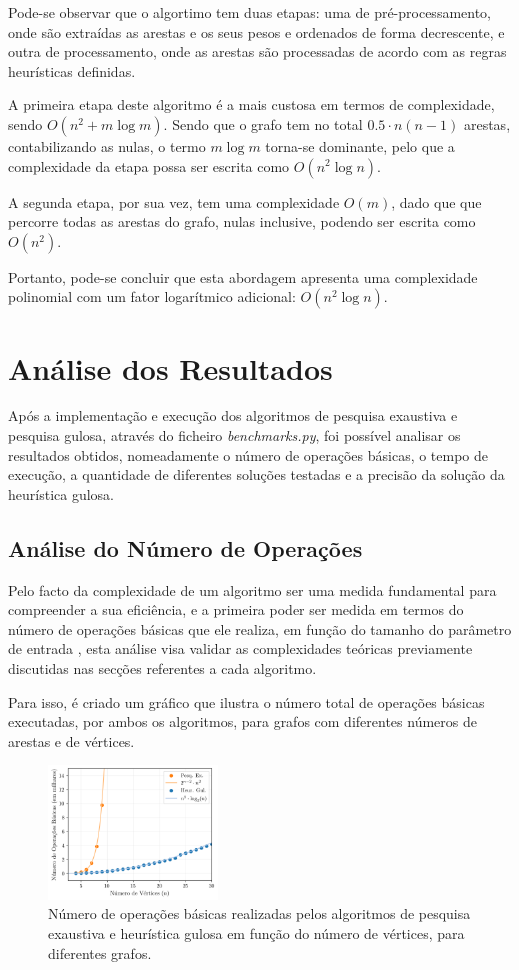 \documentclass[mirror]{revdetua}
\begin{document}
Pode-se observar que o algortimo tem duas etapas: uma de pré-processamento, onde são extraídas as arestas e os seus pesos e ordenados de forma decrescente, e outra de processamento, onde as arestas são processadas de acordo com as regras heurísticas definidas.

A primeira etapa deste algoritmo é a mais custosa em termos de complexidade, sendo $O(n^2 + m \log m)$. Sendo que o grafo tem no total $0.5 \cdot n(n-1)$ arestas, contabilizando as nulas, o termo $m \log m$ torna-se dominante, pelo que a complexidade da etapa possa ser escrita como $O(n^2 \log n)$.

A segunda etapa, por sua vez, tem uma complexidade $O(m)$, dado que que percorre todas as arestas do grafo, nulas inclusive, podendo ser escrita como $O(n^2)$.

Portanto, pode-se concluir que esta abordagem apresenta uma complexidade polinomial com um fator logarítmico adicional: $O(n^2 \log n)$.

\section{Análise dos Resultados}

Após a implementação e execução dos algoritmos de pesquisa exaustiva e pesquisa gulosa, através do ficheiro \textit{benchmarks.py}, foi possível analisar os resultados obtidos, nomeadamente o número de operações básicas, o tempo de execução, a quantidade de diferentes soluções testadas e a precisão da solução da heurística gulosa.

\subsection{Análise do Número de Operações}

Pelo facto da complexidade de um algoritmo ser uma medida fundamental para compreender a sua eficiência, e a primeira poder ser medida em termos do número de operações básicas que ele realiza, em função do tamanho do parâmetro de entrada \cite{BS22}, esta análise visa validar as complexidades teóricas previamente discutidas nas secções referentes a cada algoritmo.

Para isso, é criado um gráfico que ilustra o número total de operações básicas executadas, por ambos os algoritmos, para grafos com diferentes números de arestas e de vértices.

\begin{figure}[h]
    \centering
    \includegraphics[width=0.4\textwidth]{../assets/numberOPS.png}
    \caption{Número de operações básicas realizadas pelos algoritmos de pesquisa exaustiva e heurística gulosa em função do número de vértices, para diferentes grafos.}
    \label{fig:numeroops}
\end{figure}
\end{document}
